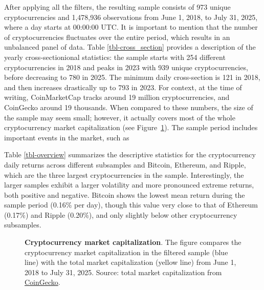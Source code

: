 \documentclass[
  12pt,
  a4paper,
  openany]{scrbook}
\begin{document}
After applying all the filters, the resulting sample consists of 973
unique cryptocurrencies and 1,478,936 observations from June 1, 2018, to
July 31, 2025, where a day starts at 00:00:00 UTC. It is important to
mention that the number of cryptocurrencies fluctuates over the entire
period, which results in an unbalanced panel of data. Table
\ref{tbl-cross_section} provides a description of the yearly
cross-sectionional statistics: the sample starts with 254 different
cryptocurrencies in 2018 and peaks in 2023 with 939 unique
cryptocurrencies, before decreasing to 780 in 2025. The minimum daily
cross-section is 121 in 2018, and then increases drastically up to 793
in 2023. For context, at the time of writing, CoinMarketCap tracks
around 19 million cryptocurrencies, and CoinGecko around 19 thousands.
When compared to these numbers, the size of the sample may seem small;
however, it actually covers most of the whole cryptocurrency market
capitalization (see Figure~\ref{fig-samplemarketcap}). The sample period
includes important events in the market, such as

Table \ref{tbl-overview} summarizes the descriptive statistics for the
cryptocurrency daily returns across different subsamples and Bitcoin,
Ethereum, and Ripple, which are the three largest cryptocurrencies in
the sample. Interestingly, the larger samples exhibit a larger
volatility and more pronounced extreme returns, both positive and
negative. Bitcoin shows the lowest mean return during the sample period
(0.16\% per day), though this value very close to that of Ethereum
(0.17\%) and Ripple (0.20\%), and only slightly below other
cryptocurrency subsamples.

\begin{figure}[h]


\caption[Cryptocurrency market
capitalization]{\label{fig-samplemarketcap}\textbf{Cryptocurrency market
capitalization}. The figure compares the cryptocurrency market
capitalization in the filtered sample (blue line) with the total market
capitalization (yellow line) from June 1, 2018 to July 31, 2025. Source:
total market capitalization from
\href{https://www.coingecko.com/}{CoinGecko}.}

\end{figure}%
\end{document}
